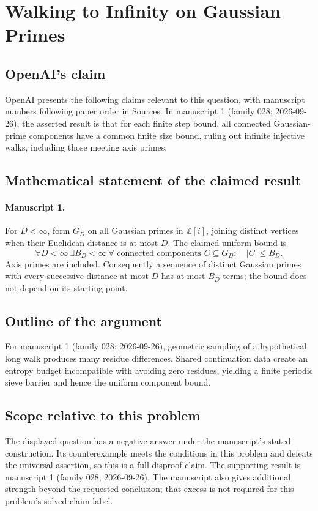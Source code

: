 \documentclass[11pt]{article}
\begin{document}
\section*{Walking to Infinity on Gaussian Primes}

\subsection{OpenAI's claim}
OpenAI presents the following claims relevant to this question, with manuscript numbers following paper order in Sources. In manuscript 1 (family 028; 2026-09-26), the asserted result is that for each finite step bound, all connected Gaussian-prime components have a common finite size bound, ruling out infinite injective walks, including those meeting axis primes.

\subsection{Mathematical statement of the claimed result}
\paragraph{Manuscript 1.}
For $D<\infty$, form $G_D$ on all Gaussian primes in $\mathbb Z[i]$, joining distinct vertices when their Euclidean distance is at most $D$. The claimed uniform bound is
\[
 \forall D<\infty\ \exists B_D<\infty\ \forall\text{ connected components }C\subseteq G_D:\quad |C|\le B_D.
\]
Axis primes are included. Consequently a sequence of distinct Gaussian primes with every successive distance at most $D$ has at most $B_D$ terms; the bound does not depend on its starting point.

\subsection{Outline of the argument}
For manuscript 1 (family 028; 2026-09-26), geometric sampling of a hypothetical long walk produces many residue differences. Shared continuation data create an entropy budget incompatible with avoiding zero residues, yielding a finite periodic sieve barrier and hence the uniform component bound.

\subsection{Scope relative to this problem}
The displayed question has a negative answer under the manuscript's stated construction. Its counterexample meets the conditions in this problem and defeats the universal assertion, so this is a full disproof claim. The supporting result is manuscript 1 (family 028; 2026-09-26). The manuscript also gives additional strength beyond the requested conclusion; that excess is not required for this problem's solved-claim label.
\end{document}
